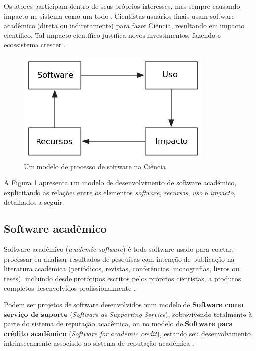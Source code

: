 Os atores participam dentro de seus próprios interesses, mas sempre causando
impacto no sistema como um todo \cite{manikas2013software}.
Cientistas usuários finais usam software acadêmico (direta ou indiretamente)
para fazer Ciência, resultando em impacto científico. Tal impacto científico
justifica novos investimentos, fazendo o ecossistema crescer
\cite{howison2015understanding}.

\begin{figure}[h]
  \center
  \includegraphics[scale=0.5]{imagens/process-model-scientific-software-dia.png}
  \caption{Um modelo de processo de software na Ciência~\cite{howison2015understanding}}
  \label{process-model-scientific-software}
\end{figure}

A Figura \ref{process-model-scientific-software} apresenta um modelo de
desenvolvimento de software acadêmico, explicitando as relações entre os
elementos \textit{software}, \textit{recursos}, \textit{uso} e
\textit{impacto}, detalhados a seguir.

\subsection{Software acadêmico}

Software acadêmico ({\it academic software}) é todo software usado para
coletar, processar ou analisar resultados de pesquisas com intenção de
publicação na literatura acadêmica (periódicos, revistas, conferências,
monografias, livros ou teses), incluindo desde protótipos escritos pelos
próprios cientistas, a produtos completos desenvolvidos profissionalmente
\cite{allen2017engineering}.

Podem ser projetos de software desenvolvidos num modelo de {\bf Software como
serviço de suporte} ({\it Software as Supporting Service}), sobrevivendo
totalmente à parte do sistema de reputação acadêmica, ou no modelo de {\bf
Software para crédito acadêmico} ({\it Software for academic credit}), estando
seu desenvolvimento intrinsecamente associado ao sistema de reputação acadêmica
\cite{howison2011scientific}.

